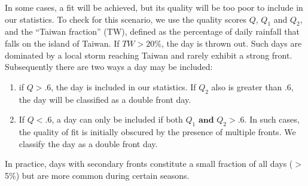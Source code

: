 \documentclass[draft,grl]{AGUTeX}
\begin{document}
\begin{article}
\begin{enumerate}
\end{enumerate} 
	
In some cases, a fit will be achieved, but its quality will be too poor to include in our statistics. To check for this scenario, we use the quality scores $Q$, $Q_1$ and $Q_2$, and the ``Taiwan fraction'' (TW), defined as the percentage of daily rainfall that falls on the island of Taiwan. If $TW > 20\%$, the day is thrown out. Such days are dominated by a local storm reaching Taiwan and rarely exhibit a strong front. Subsequently there are two ways a day may be included: 
	
\begin{enumerate}
	\item if $Q>.6$, the day is included in our statistics. If $Q_2$ also is greater than .6, the day will be classified as a double front day.
		
	\item If $Q<.6$, a day can only be included if both $Q_1 \mathrm{\textbf{ and }} Q_2 > .6$. In such cases, the quality of fit is initially obscured by the presence of multiple fronts. We classify the day as a double front day.
\end{enumerate}	
		
	In practice, days with secondary fronts constitute a small fraction of all days ($>$ 5\%) but are more common during certain seasons.
		


\end{article}
\end{document}
